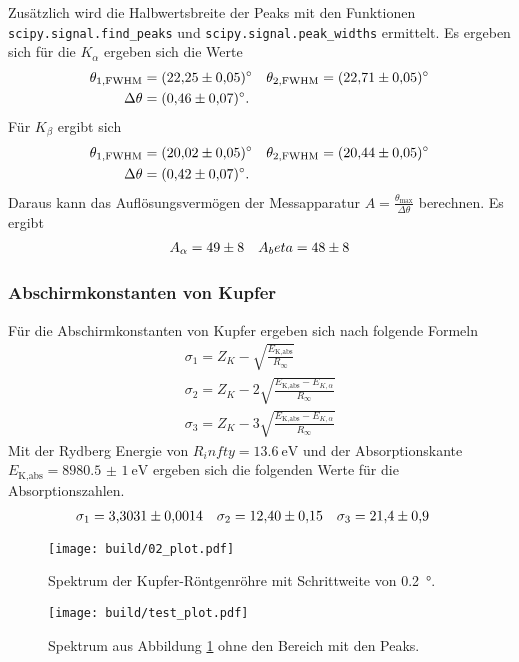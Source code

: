 Zusätzlich wird die Halbwertsbreite der Peaks mit den Funktionen \texttt{scipy.signal.find\_peaks}  und \texttt{scipy.signal.peak\_widths} \cite{scipy} ermittelt.
Es ergeben sich für die $K_\alpha$ ergeben sich die Werte
\begin{align*}
    \theta_{1,\text{FWHM}} &= \qty{22.25 \pm 0.05}{\degree} & \theta_{2,\text{FWHM}} = \qty{22.71 \pm 0.05}{\degree} \\
    \Delta \theta &= \qty{0.46 \pm 0.07}{\degree}.
\end{align*}
Für $K_\beta$ ergibt sich
\begin{align*}
    \theta_{1,\text{FWHM}} &= \qty{20.02 \pm 0.05}{\degree} & \theta_{2,\text{FWHM}} = \qty{20.44 \pm 0.05}{\degree} \\
    \Delta \theta &= \qty{0.42 \pm 0.07}{\degree}.
\end{align*}
Daraus kann das Auflösungsvermögen der Messapparatur $A= \frac{\theta_\text{max}}{\Delta \theta}$ berechnen.
Es ergibt
\begin{align*}
    A_\alpha &= \num{49 \pm 8} & A_beta = \num{48 \pm 8}
\end{align*}

\subsubsection{Abschirmkonstanten von Kupfer}
Für die Abschirmkonstanten von Kupfer ergeben sich nach \cite{man:v602} folgende Formeln
\begin{align}
    \sigma_1 = Z_K -\sqrt{\frac{E_\text{K,abs}}{R_\infty}}\\
    \sigma_2 = Z_K -2\sqrt{\frac{E_\text{K,abs}- E_{K,\alpha} }{R_\infty}}\\
    \sigma_3 = Z_K -3\sqrt{\frac{E_\text{K,abs}- E_{K,\alpha} }{R_\infty}}
\end{align}
Mit der Rydberg Energie von $R_infty = \qty{13.6}{\eV}$ und der Absorptionskante $E_\text{K,abs} = \qty{8980.5(10)}{\eV}$ \cite{x-ray}
ergeben sich die folgenden Werte für die Absorptionszahlen.
\begin{align}
    \sigma_1 &= \num{3.3031 \pm 0.0014} &
    \sigma_2 &= \num{12.40 \pm 0.15} &
    \sigma_3 &= \num{21.4 \pm 0.9}
\end{align}



\begin{figure}
    \centering
    \texttt{[image: build/02\_plot.pdf]}
    \caption{Spektrum der Kupfer-Röntgenröhre mit Schrittweite von \qty{0.2}{\degree}.}
    \label{fig:02}
\end{figure}
\begin{figure}
    \centering
    \texttt{[image: build/test\_plot.pdf]}
    \caption{Spektrum aus Abbildung \ref{fig:02} ohne den Bereich mit den Peaks.}
    \label{fig:test}
\end{figure}

